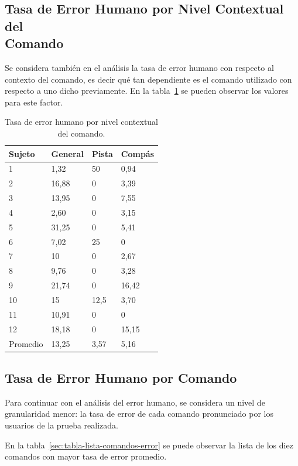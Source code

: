 \subsection[Tasa de Error Humano por Nivel Contextual del Comando]
{Tasa de Error Humano por Nivel Contextual del \\ Comando}

Se considera tambi\'en en el an\'alisis la tasa de error humano con respecto al contexto del comando, es decir
qu\'e tan dependiente es el comando utilizado con respecto a uno dicho previamente. 
En la tabla~\ref{sec:error-contexto} se pueden observar los valores para este factor.

\begin{table}[H]
\centering
\footnotesize
\begin{tabular}{|p{1.6cm}|p{1.6cm}|p{1.6cm}|p{1.6cm}|}
\hline
    Sujeto & General & Pista & Comp\'as \\
    \hline
1 & 1,32  & 50     & 0,94 \\
2 & 16,88 & 0      & 3,39 \\
3 & 13,95 & 0      & 7,55 \\
4 & 2,60 & 0      & 3,15 \\
5 & 31,25 & 0      & 5,41 \\
6 & 7,02 & 25     & 0 \\
7 & 10     & 0      & 2,67 \\
8 & 9,76 & 0      & 3,28 \\
9 & 21,74 & 0      & 16,42 \\
10 & 15     & 12,5 & 3,70 \\
11 & 10,91 & 0      & 0 \\
12 & 18,18 & 0      & 15,15 \\
\hline
Promedio & 13,25 & 3,57 & 5,16 \\
\hline
\end{tabular}
\caption{Tasa de error humano por nivel contextual del comando.}
\label{sec:error-contexto}
\end{table}


\subsection{Tasa de Error Humano por Comando}
Para continuar con el an\'alisis del error humano, se considera un nivel de granularidad menor:
la tasa de error de cada comando pronunciado por los usuarios de la prueba realizada.

En la tabla~\ref{sec:tabla-lista-comandos-error} se puede observar la lista de los diez comandos 
con mayor tasa de error promedio.

